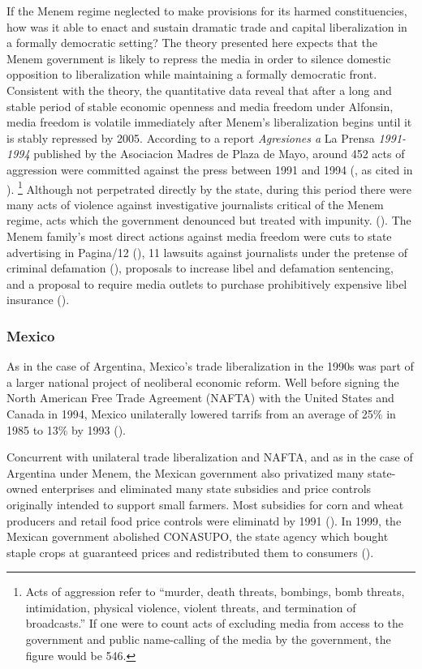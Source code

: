 \documentclass[12pt]{report}
\begin{document}
If the Menem regime neglected to make provisions for its harmed constituencies, how was it able to
enact and sustain dramatic trade and capital liberalization in a formally democratic setting? The
theory presented here expects that the Menem government is likely to repress the media in order to
silence domestic opposition to liberalization while maintaining a formally democratic front.
Consistent with the theory, the quantitative data reveal that after a long and stable period of
stable economic openness and media freedom under Alfonsin, media freedom is volatile immediately
after Menem's liberalization begins until it is stably repressed by 2005. According to a report
\emph{Agresiones a }La Prensa\emph{ 1991-1994} published by the Asociacion Madres de Plaza de Mayo,
around 452 acts of aggression were committed against the press between 1991 and 1994
(\citealt{Delgado:1995tr}, as cited in \citealt[247]{Park:2002io}). \footnote{Acts of aggression
refer to ``murder, death threats, bombings, bomb threats, intimidation, physical violence, violent
threats, and termination of broadcasts.'' If one were to count acts of excluding media from access
to the government and public name-calling of the media by the government, the figure would be 546.
} Although not perpetrated directly by the state, during this period there were many acts of
violence against investigative journalists critical of the Menem regime, acts which the government
denounced but treated with impunity. (\citealt{Long:1993wb}). The Menem family's most direct actions
against media freedom were cuts to state advertising in Pagina/12 (\citealt[27]{Waisbord:1994kq}),
11 lawsuits against journalists under the pretense of criminal defamation
(\citealt{McCullough:1991cs}), proposals to increase libel and
defamation sentencing, and a proposal to require media outlets to purchase prohibitively expensive
libel insurance (\citealt{Sims:kgMPqAHd}).

\subsubsection{Mexico}

As in the case of Argentina, Mexico's trade liberalization in the 1990s was part of a larger
national project of neoliberal economic reform. Well before signing the North American Free Trade
Agreement (NAFTA) with the United States and Canada in 1994, Mexico unilaterally lowered tarrifs
from an average of 25\% in 1985 to 13\% by 1993 (\citealt{McDaniel:2003kw}).

Concurrent with unilateral trade liberalization and NAFTA, and as in the case of Argentina under
Menem, the Mexican government also privatized many state-owned enterprises and eliminated many state
subsidies and price controls originally intended to support small farmers. Most subsidies for corn
and wheat producers and retail food price controls were eliminatd by 1991
(\citealt[295]{Hufbauer:2005vh}). In 1999, the Mexican government abolished CONASUPO, the state
agency which bought staple crops at guaranteed prices and redistributed them to consumers
(\citealt[12]{Villareal:2010vk}).
\end{document}
